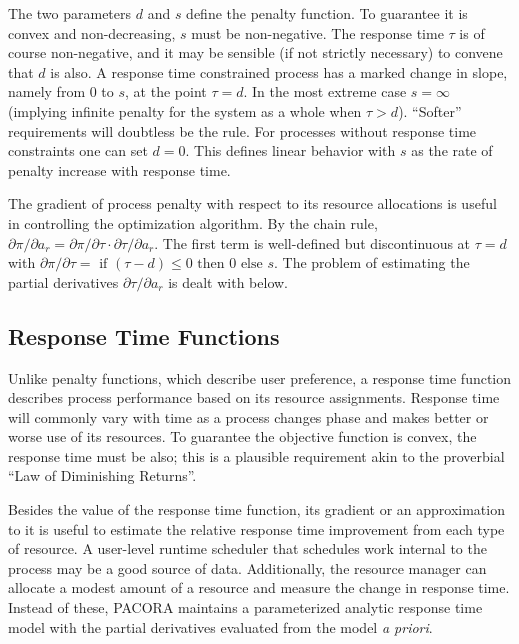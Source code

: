 The two parameters $d$ and $s$ define the penalty function.
To guarantee it is convex and non-decreasing, $s$ must be non-negative.
The response time $\tau$  is of course non-negative,
and it may be sensible (if not strictly necessary) to convene that $d$ is also.
A response time constrained process has a marked change in slope, namely from 0 to $s$, at the point $\tau= d$.
In the most extreme case $s = \infty$ (implying infinite penalty for the system as a whole when $\tau > d$).  ``Softer'' requirements will doubtless be the rule.
For processes without response time constraints one can set $d = 0$.
This defines linear behavior with $s$ as the rate of penalty increase with response time.

The gradient of process penalty with respect to its resource allocations is useful in controlling the optimization algorithm.
By the chain rule, $\partial\pi/\partial a_r = \partial\pi/\partial\tau\cdot\partial\tau/\partial a_r$.
The first term is well-defined but discontinuous at $\tau = d$ with
$\partial\pi/\partial\tau = \mbox{ if } (\tau - d) \leq 0 \mbox{ then } 0 \mbox{ else } s$.
The problem of estimating the partial derivatives $\partial\tau/\partial a_r$ is dealt with below.

\subsection*{Response Time Functions}

Unlike penalty functions, which describe user preference, a response time function describes process performance based on its resource assignments.
Response time will commonly vary with time as a process changes phase and makes better or worse use of its resources.
To guarantee the objective function is convex, the response time must be also;
this is a plausible requirement akin to the proverbial ``Law of Diminishing Returns''.

Besides the value of the response time function, its gradient or an approximation to it is useful to estimate the relative response time improvement from each type of resource.  A user-level runtime scheduler that schedules work internal to the process may be a good source of data.
Additionally, the resource manager can allocate a modest amount of a resource and measure the change in response time.
Instead of these, PACORA maintains a parameterized analytic response time model with the partial derivatives evaluated from the model \emph{a priori}.

